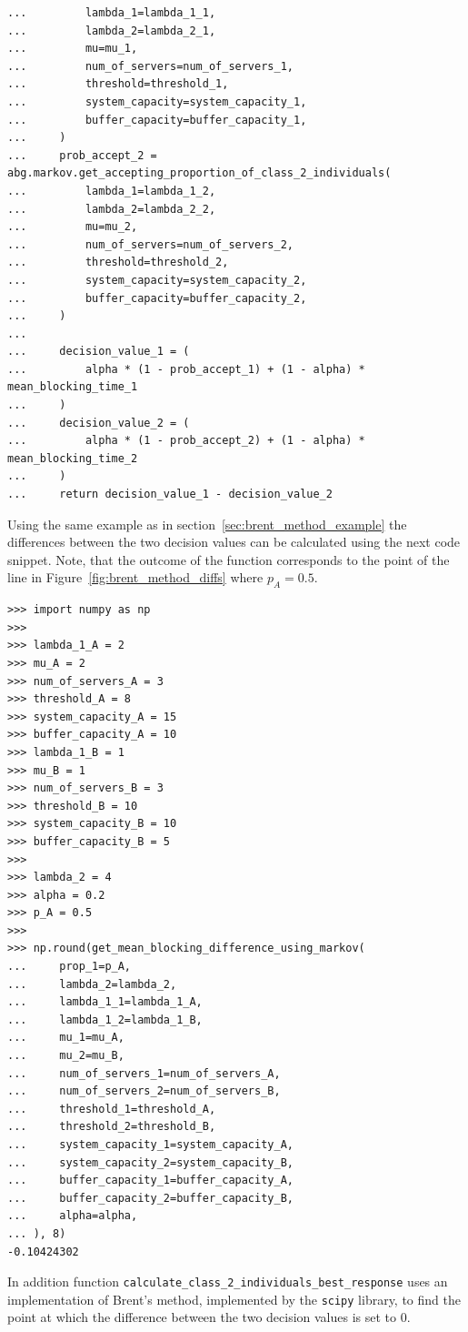 \begin{lstlisting}[style=pystyle]
...         lambda_1=lambda_1_1,
...         lambda_2=lambda_2_1,
...         mu=mu_1,
...         num_of_servers=num_of_servers_1,
...         threshold=threshold_1,
...         system_capacity=system_capacity_1,
...         buffer_capacity=buffer_capacity_1,
...     )
...     prob_accept_2 = abg.markov.get_accepting_proportion_of_class_2_individuals(
...         lambda_1=lambda_1_2,
...         lambda_2=lambda_2_2,
...         mu=mu_2,
...         num_of_servers=num_of_servers_2,
...         threshold=threshold_2,
...         system_capacity=system_capacity_2,
...         buffer_capacity=buffer_capacity_2,
...     )
...
...     decision_value_1 = (
...         alpha * (1 - prob_accept_1) + (1 - alpha) * mean_blocking_time_1
...     )
...     decision_value_2 = (
...         alpha * (1 - prob_accept_2) + (1 - alpha) * mean_blocking_time_2
...     )
...     return decision_value_1 - decision_value_2

\end{lstlisting}

Using the same example as in section~\ref{sec:brent_method_example} the
differences between the two decision values can be calculated using the next
code snippet.
Note, that the outcome of the function corresponds to the point of the line in
Figure~\ref{fig:brent_method_diffs} where \(p_A = 0.5\).

\begin{lstlisting}[style=pystyle]
>>> import numpy as np
>>>
>>> lambda_1_A = 2
>>> mu_A = 2
>>> num_of_servers_A = 3
>>> threshold_A = 8
>>> system_capacity_A = 15
>>> buffer_capacity_A = 10
>>> lambda_1_B = 1
>>> mu_B = 1
>>> num_of_servers_B = 3
>>> threshold_B = 10
>>> system_capacity_B = 10
>>> buffer_capacity_B = 5
>>>
>>> lambda_2 = 4
>>> alpha = 0.2
>>> p_A = 0.5
>>>
>>> np.round(get_mean_blocking_difference_using_markov(
...     prop_1=p_A,
...     lambda_2=lambda_2,
...     lambda_1_1=lambda_1_A,
...     lambda_1_2=lambda_1_B,
...     mu_1=mu_A,
...     mu_2=mu_B,
...     num_of_servers_1=num_of_servers_A,
...     num_of_servers_2=num_of_servers_B,
...     threshold_1=threshold_A,
...     threshold_2=threshold_B,
...     system_capacity_1=system_capacity_A,
...     system_capacity_2=system_capacity_B,
...     buffer_capacity_1=buffer_capacity_A,
...     buffer_capacity_2=buffer_capacity_B,
...     alpha=alpha,
... ), 8)
-0.10424302

\end{lstlisting}

In addition function
\lstinline[style=pystyle]{calculate_class_2_individuals_best_response} uses
an implementation of Brent's method, implemented by the
\lstinline[style=pystyle]{scipy} library, to find the point at which the
difference between the two decision values is set to 0.

